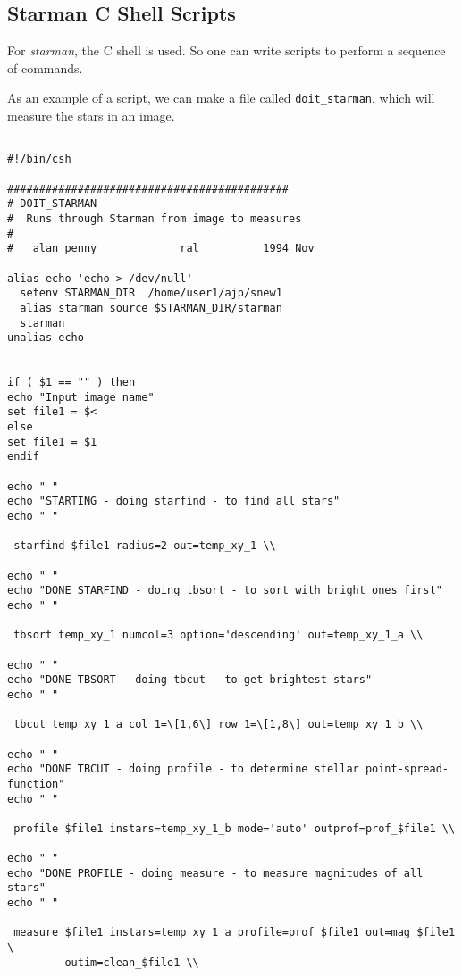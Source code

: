      
\subsection{Starman C Shell Scripts}
 
For {\it starman}, the C shell is used. So one can write scripts to perform
a sequence of \starman commands.
 
As an example of a script, we can make a file called \verb|doit_starman|.
which will measure the stars in an image.
 
\begin{verbatim}
 
#!/bin/csh
 
############################################
# DOIT_STARMAN
#  Runs through Starman from image to measures
#
#   alan penny             ral          1994 Nov
 
alias echo 'echo > /dev/null'
  setenv STARMAN_DIR  /home/user1/ajp/snew1
  alias starman source $STARMAN_DIR/starman
  starman
unalias echo
 
 
if ( $1 == "" ) then
echo "Input image name"
set file1 = $<
else
set file1 = $1
endif
 
echo " "
echo "STARTING - doing starfind - to find all stars"
echo " "
 
 starfind $file1 radius=2 out=temp_xy_1 \\
 
echo " "
echo "DONE STARFIND - doing tbsort - to sort with bright ones first"
echo " "
 
 tbsort temp_xy_1 numcol=3 option='descending' out=temp_xy_1_a \\
 
echo " "
echo "DONE TBSORT - doing tbcut - to get brightest stars"
echo " "
 
 tbcut temp_xy_1_a col_1=\[1,6\] row_1=\[1,8\] out=temp_xy_1_b \\
 
echo " "
echo "DONE TBCUT - doing profile - to determine stellar point-spread-function"
echo " "
 
 profile $file1 instars=temp_xy_1_b mode='auto' outprof=prof_$file1 \\
 
echo " "
echo "DONE PROFILE - doing measure - to measure magnitudes of all stars"
echo " "
 
 measure $file1 instars=temp_xy_1_a profile=prof_$file1 out=mag_$file1 \
         outim=clean_$file1 \\
 
 
\end{verbatim}
 
